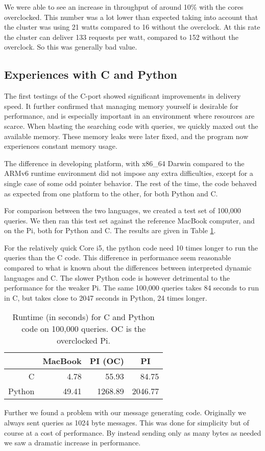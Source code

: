 We were able to see an increase in throughput of around 10\% with the cores overclocked. This number was a lot lower than expected taking into account that the cluster was using 21 watts compared to 16 without the overclock. At this rate the cluster can deliver 133 requests per watt, compared to 152 without the overclock. So this was generally bad value.


\subsection{Experiences with {C} and Python}
The first testings of the C-port showed significant improvements in delivery speed.
It further confirmed that managing memory yourself is desirable for performance, and is especially important in an environment where resources are scarce.
When blasting the searching code with queries, we quickly maxed out the available memory.
These memory leaks were later fixed, and the program now experiences constant memory usage.

The difference in developing platform, with x86\_64 Darwin compared to the ARMv6 runtime environment did not impose any extra difficulties, except for a single case of some odd pointer behavior.
The rest of the time, the code behaved as expected from one platform to the other, for both Python and C.

For comparison between the two languages, we created a test set of 100,000 queries. We then ran this test set against the reference MacBook computer, and on the Pi, both for Python and {C}.
The results are given in Table \ref{tbl:runtimes_ports}.

For the relatively quick {Core i5}, the python code need 10 times longer to run the queries than the C code. This difference in performance seem reasonable compared to what is known about the differences between interpreted dynamic languages and C.
The slower Python code is however detrimental to the performance for the weaker Pi. The same 100,000 queries takes 84 seconds to run in C, but takes close to 2047 seconds in Python, 24 times longer.

\begin{table}[h]
    \begin{center}
    \begin{tabular}{|r|r|r|r|}
    \hline
       & \multicolumn{1}{|c|}{MacBook} & \multicolumn{1}{|c|}{PI (OC)}  & \multicolumn{1}{|c|}{PI} \\
    \hline
    C      & 4.78 & 55.93 & 84.75     \\
    \hline
    Python & 49.41 & 1268.89 & 2046.77   \\

    \hline
    \end{tabular}
    \caption{Runtime (in seconds) for C and Python code on 100,000 queries. OC is the overclocked Pi.}
    \label{tbl:runtimes_ports}
    \end{center}
\end{table}

Further we found a problem with our message generating code. Originally we always sent queries as 1024 byte messages. This was done for simplicity but of course at a cost of performance. By instead sending only as many bytes as needed we saw a dramatic increase in performance.











